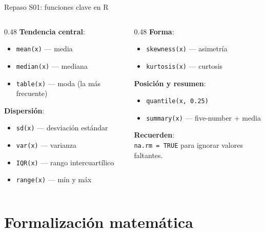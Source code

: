 \documentclass[aspectratio=169, 11pt]{beamer}
\begin{document}
\begin{frame}{Repaso S01: funciones clave en R}
\small
\begin{columns}[T]
\begin{column}{0.48\textwidth}
\textbf{Tendencia central}:
\begin{itemize}\setlength{\itemsep}{1pt}
\item \texttt{mean(x)} --- media
\item \texttt{median(x)} --- mediana
\item \texttt{table(x)} --- moda (la m\'as frecuente)
\end{itemize}

\vspace{0.3em}
\textbf{Dispersi\'on}:
\begin{itemize}\setlength{\itemsep}{1pt}
\item \texttt{sd(x)} --- desviaci\'on est\'andar
\item \texttt{var(x)} --- varianza
\item \texttt{IQR(x)} --- rango intercuart\'ilico
\item \texttt{range(x)} --- m\'in y m\'ax
\end{itemize}
\end{column}
\begin{column}{0.48\textwidth}
\textbf{Forma}:
\begin{itemize}\setlength{\itemsep}{1pt}
\item \texttt{skewness(x)} --- asimetr\'ia
\item \texttt{kurtosis(x)} --- curtosis
\end{itemize}

\vspace{0.3em}
\textbf{Posici\'on y resumen}:
\begin{itemize}\setlength{\itemsep}{1pt}
\item \texttt{quantile(x, 0.25)}
\item \texttt{summary(x)} --- five-number + media
\end{itemize}

\vspace{0.3em}
\textbf{Recuerden}:\\
\texttt{na.rm = TRUE} para ignorar valores faltantes.
\end{column}
\end{columns}
\end{frame}

\section{Formalizaci\'on matem\'atica}
\end{document}
